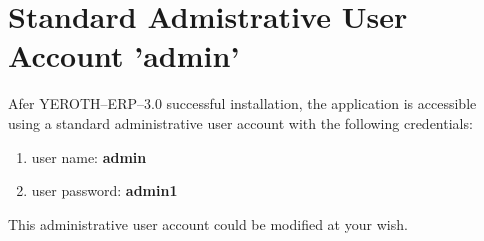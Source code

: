 \documentclass[a4paper, 10pt]{article}
\newcommand{\yerotherptroiszero}{\textcolor{yerothColorBlue}{\sc YEROTH--ERP--$3.0$}\xspace}
\begin{document}
\section{Standard Admistrative User Account 'admin'}


Afer \yerotherptroiszero successful installation,
the application is accessible using a standard
administrative user account with the following
credentials:

\begin{enumerate}[1)]
	\item user name: \textbf{admin}
	\item user password: \textbf{admin1}
\end{enumerate}

This administrative user account could be modified at your wish.
\end{document}
